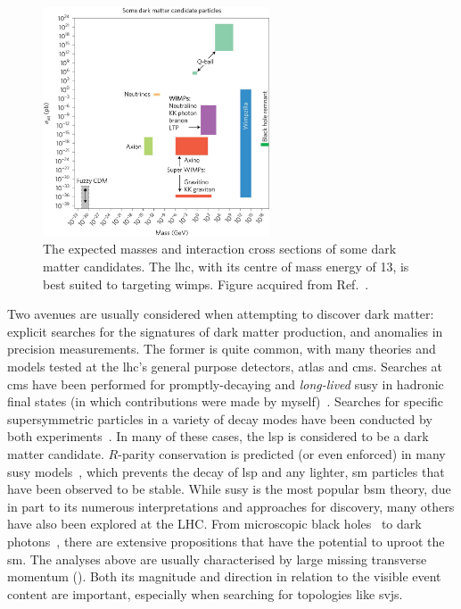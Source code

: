 \begin{figure}[htbp]
    \centering
    \includegraphics[width=0.6\textwidth]{figures/dm_masses_xsecs.jpg}
    \caption[The expected masses and interaction cross sections of some dark matter candidates. The LHC, with its centre of mass energy of 13\TeV, is best suited to targeting WIMPs]{The expected masses and interaction cross sections of some dark matter candidates. The \acrshort{lhc}, with its centre of mass energy of 13\TeV, is best suited to targeting \glspl{wimp}. Figure acquired from Ref.~.}
    \label{fig:dm_masses_xsecs}
\end{figure}

Two avenues are usually considered when attempting to discover dark matter: explicit searches for the signatures of dark matter production, and anomalies in precision measurements. The former is quite common, with many theories and models tested at the \acrshort{lhc}'s general purpose detectors, \acrshort{atlas} and \acrshort{cms}. Searches at \acrshort{cms} have been performed for promptly-decaying and \emph{long-lived} \acrlong{susy} in hadronic final states (in which contributions were made by myself)~\cite{CMS-PAPER-SUS-15-005-published,SUS16038published}. Searches for specific supersymmetric particles in a variety of decay modes have been conducted by both experiments~\cite{CANEPA2019100033}. In many of these cases, the \acrfull{lsp} is considered to be a dark matter candidate. $R$-parity conservation is predicted (or even enforced) in many \acrshort{susy} models~\cite{Martin:1997ns}, which prevents the decay of \acrshort{lsp} and any lighter, \acrlong{sm} particles that have been observed to be stable. While \acrlong{susy} is the most popular \acrshort{bsm} theory, due in part to its numerous interpretations and approaches for discovery, many others have also been explored at the LHC. From microscopic black holes~\cite{Khachatryan:2010wx} to dark photons~\cite{dark_photons_CMS_2019}, there are extensive propositions that have the potential to uproot the \acrlong{sm}. The analyses above are usually characterised by large missing transverse momentum (\ptvecmiss). Both its magnitude and direction in relation to the visible event content are important, especially when searching for topologies like \glspl{svj}. 

